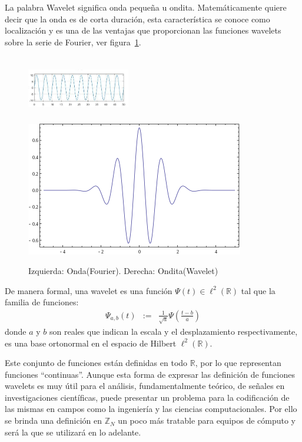 \par La palabra Wavelet significa onda peque\~na u ondita. Matem\'aticamente quiere decir que la onda es de corta duraci\'on, esta caracter\'istica se conoce como localizaci\'on y es una de las ventajas que proporcionan las funciones wavelets sobre la serie de Fourier, ver figura~\ref{wav-fourier}.\\

\begin{figure}[h]
\center
\includegraphics[height=29mm, width=45mm]{Graphics/FourierOnda.png}
\includegraphics[scale=.33]{Graphics/FuncionWavelet.png}
\caption{Izquierda: Onda(Fourier). Derecha: Ondita(Wavelet)}
\label{wav-fourier}
\end{figure}

\begin{definition}
De manera formal, una wavelet es una funci\'on $\Psi(t)\in \ell^2(\mathbb{R})$ tal que la familia de funciones:
\begin{eqnarray}
\Psi_{a,b}(t)&:=&\frac{1}{\sqrt{a}}\Psi\left(\frac{t-b}{a}\right)\nonumber
\end{eqnarray}
donde $a$ y $b$ son reales que indican la escala y el desplazamiento respectivamente, es una base ortonormal en el espacio de Hilbert $\ell^2(\mathbb{R})$.
\label{wav-continua}
\end{definition}

\par Este conjunto de funciones est\'an definidas en todo $\mathbb{R}$, por lo que representan funciones ``continuas''. Aunque esta forma de expresar las definici\'on de funciones wavelets es muy \'util para el an\'alisis, fundamentalmente te\'orico, de se\~nales en investigaciones cient\'ificas, puede presentar un problema para la codificaci\'on de las mismas en campos como la ingenier\'ia y las ciencias computacionales. Por ello se brinda una definici\'on en $\mathbb{Z}_N$ un poco m\'as tratable para equipos de c\'omputo y ser\'a la que se utilizar\'a en lo adelante.\\

